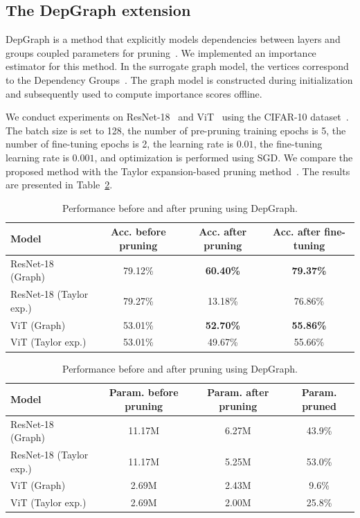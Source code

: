 \documentclass[runningheads]{llncs}
\begin{document}
\subsection{The DepGraph extension}

DepGraph is a method that explicitly models dependencies between layers and groups coupled parameters for pruning~\cite{Fang2023}. We implemented an importance estimator for this method. In the surrogate graph model, the vertices correspond to the Dependency Groups~\cite{Fang2023}. The graph model is constructed during initialization and subsequently used to compute importance scores offline.

We conduct experiments on ResNet-18~\cite{he2015deepresiduallearningimage} and ViT~\cite{dosovitskiy2021imageworth16x16words} using the CIFAR-10 dataset~\cite{krizhevsky2009learning}. The batch size is set to 128, the number of pre-pruning training epochs is 5, the number of fine-tuning epochs is 2, the learning rate is $0.01$, the fine-tuning learning rate is $0.001$, and optimization is performed using SGD. We compare the proposed method with the Taylor expansion-based pruning method~\cite{Molchanov2019}. The results are presented in Table~\ref{results_depgraph}.

\begin{table}[H]
\caption{Performance before and after pruning using DepGraph.}
\label{results_depgraph}
\centering
\begin{tabular}{|l|c|c|c|}
\hline
\bfseries Model & Acc. before pruning & Acc. after pruning & Acc. after fine-tuning \\
\hline
ResNet-18 (Graph) & 79.12\% & \textbf{60.40\%} & \textbf{79.37\%} \\
ResNet-18 (Taylor exp.) & 79.27\% & 13.18\% & 76.86\% \\
ViT (Graph) & 53.01\% & \textbf{52.70\%} & \textbf{55.86\%} \\
ViT (Taylor exp.) & 53.01\% & 49.67\% & 55.66\% \\
\hline
\end{tabular}

\vspace{0.5em}

\begin{tabular}{|l|c|c|c|}
\hline
\bfseries Model & Param. before pruning & Param. after pruning & Param. pruned \\
\hline
ResNet-18 (Graph) & 11.17M & 6.27M & 43.9\% \\
ResNet-18 (Taylor exp.) & 11.17M & 5.25M & 53.0\% \\
ViT (Graph) & 2.69M & 2.43M & 9.6\% \\
ViT (Taylor exp.) & 2.69M & 2.00M & 25.8\% \\
\hline
\end{tabular}
\end{table}
\end{document}
